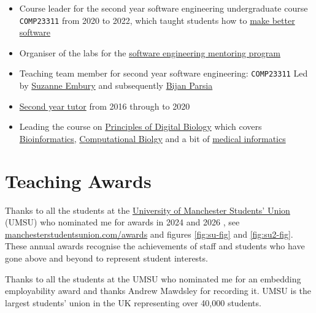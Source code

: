 \documentclass[
  12pt,
]{book}
\providecommand{\tightlist}{%
  \setlength{\itemsep}{0pt}\setlength{\parskip}{0pt}}
\begin{document}
\begin{itemize}
\tightlist
\item
  Course leader for the second year software engineering undergraduate course \texttt{COMP23311} from 2020 to 2022, which taught students how to \href{https://software-eng.netlify.app/}{make better software}
\item
  Organiser of the labs for the \href{https://www.cs.manchester.ac.uk/connect/business-engagement/industrial-mentoring/}{software engineering mentoring program}
\item
  Teaching team member for second year software engineering: \texttt{COMP23311} Led by \href{https://research.manchester.ac.uk/en/persons/suzanne.m.embury}{Suzanne Embury} and subsequently \href{https://research.manchester.ac.uk/en/persons/bijan.parsia}{Bijan Parsia}
\item
  \href{https://studentnet.cs.manchester.ac.uk/ugt/year2/}{Second year tutor} from 2016 through to 2020
\item
  Leading the course on \href{http://studentnet.cs.manchester.ac.uk/pgt/COMP60532/syllabus/}{Principles of Digital Biology} which covers \href{https://en.wikipedia.org/wiki/Bioinformatics}{Bioinformatics}, \href{https://en.wikipedia.org/wiki/Computational_biology}{Computational Biolgy} and a bit of \href{https://en.wikipedia.org/wiki/Health_informatics}{medical informatics} 🧬
\end{itemize}

\section{Teaching Awards}\label{awards}

Thanks to all the students at the \href{https://en.wikipedia.org/wiki/University_of_Manchester_Students\%27_Union}{University of Manchester Students' Union} (UMSU) who nominated me for awards in 2024 \citep{su2024} and 2026 \citep{whyislearninghard}, see \href{https://manchesterstudentsunion.com/awards}{manchesterstudentsunion.com/awards} and figures \ref{fig:su-fig} and \ref{fig:su2-fig}. These annual awards recognise the achievements of staff and students who have gone above and beyond to represent student interests.

\label{fig:su2-fig}Thanks to all the students at the UMSU who nominated me for an embedding employability award \citep{whyislearninghard} and thanks Andrew Mawdsley for recording it. UMSU is the largest students' union in the UK representing over 40,000 students.
\end{document}
